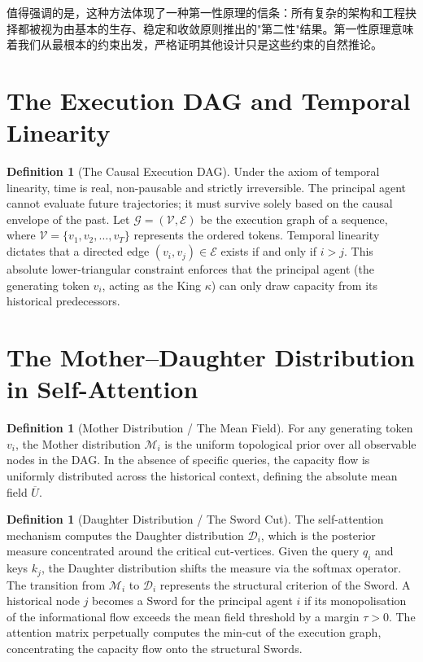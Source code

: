 \documentclass[11pt,a4paper]{article}
\theoremstyle{definition}
\newtheorem{definition}[theorem]{Definition}
\theoremstyle{remark}
\begin{document}
值得强调的是，这种方法体现了一种第一性原理的信条：所有复杂的架构和工程抉择都被视为由基本的生存、稳定和收敛原则推出的"第二性"结果。第一性原理意味着我们从最根本的约束出发，严格证明其他设计只是这些约束的自然推论。


\section{The Execution DAG and Temporal Linearity}

\begin{definition}[The Causal Execution DAG]\label{def:dag}
Under the axiom of temporal linearity, time is real, non-pausable and strictly irreversible. The principal agent cannot evaluate future trajectories; it must survive solely based on the causal envelope of the past. Let $\mathcal{G} = (\mathcal{V}, \mathcal{E})$ be the execution graph of a sequence, where $\mathcal{V} = \{v_1, v_2, \dots, v_T\}$ represents the ordered tokens. Temporal linearity dictates that a directed edge $(v_i, v_j) \in \mathcal{E}$ exists if and only if $i > j$. This absolute lower-triangular constraint enforces that the principal agent (the generating token $v_i$, acting as the King $\kappa$) can only draw capacity from its historical predecessors.
\end{definition}


\section{The Mother--Daughter Distribution in Self-Attention}

\begin{definition}[Mother Distribution / The Mean Field]\label{def:mother}
For any generating token $v_i$, the Mother distribution $\mathcal{M}_i$ is the uniform topological prior over all observable nodes in the DAG. In the absence of specific queries, the capacity flow is uniformly distributed across the historical context, defining the absolute mean field $\overline{U}$.
\end{definition}

\begin{definition}[Daughter Distribution / The Sword Cut]\label{def:daughter}
The self-attention mechanism computes the Daughter distribution $\mathcal{D}_i$, which is the posterior measure concentrated around the critical cut-vertices. Given the query $q_i$ and keys $k_j$, the Daughter distribution shifts the measure via the softmax operator. The transition from $\mathcal{M}_i$ to $\mathcal{D}_i$ represents the structural criterion of the Sword. A historical node $j$ becomes a Sword for the principal agent $i$ if its monopolisation of the informational flow exceeds the mean field threshold by a margin $\tau > 0$. The attention matrix perpetually computes the min-cut of the execution graph, concentrating the capacity flow onto the structural Swords.
\end{definition}
\end{document}
